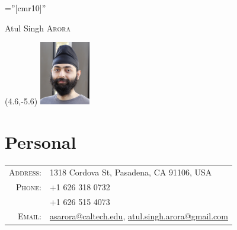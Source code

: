 \documentclass[a4paper,10pt]{article}
\begin{document}

\pagestyle{empty} %

\font\fb=''[cmr10]'' %

\par{  
		{\Huge Atul Singh \textsc{Arora}
	}  \bigskip\par}
\bigskip\bigskip\bigskip
\begin{textblock}{10}(4.6,-5.6) %
     \includegraphics[width=2.2cm]{atul.jpg}
    \end{textblock}

\section{Personal}

\begin{tabular}{rl}
    \textsc{Address:}   & 1318 Cordova St, Pasadena, CA 91106, USA \\
    \textsc{Phone:}     & +1 626 318 0732\\ 
                        & +1 626 515 4073\\
    \textsc{Email:}     & \href{mailto:asarora@caltech.edu}{asarora@caltech.edu}, \href{mailto:atul.singh.arora@gmail.com}{atul.singh.arora@gmail.com}%
\end{tabular}
\end{document}
